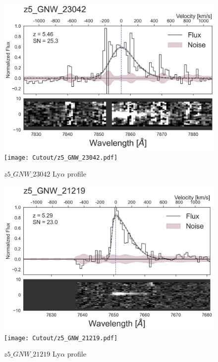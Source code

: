 \documentclass[12pt,english]{article}
\begin{document}
\begin{figure}
\begin{center}\includegraphics[width=12cm, trim=0.1cm 0cm 0cm -1cm]{LyaProfiles/z5_GNW_23042.png}
\texttt{[image: Cutout/z5\_GNW\_23042.pdf]}
\caption{$z5\_GNW\_23042$ Ly$\alpha$ profile}
\end{center}
\end{figure}
\clearpage
\begin{figure}
\begin{center}\includegraphics[width=12cm, trim=0.1cm 0cm 0cm -1cm]{LyaProfiles/z5_GNW_21219.png}
\texttt{[image: Cutout/z5\_GNW\_21219.pdf]}
\caption{$z5\_GNW\_21219$ Ly$\alpha$ profile}
\end{center}
\end{figure}
\clearpage
\end{document}
